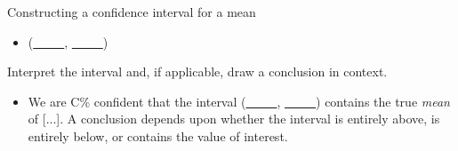 \begin{onebox}{Constructing a confidence interval for a mean}
\begin{itemize}
\begin{itemize}
\item[] $SE$ of estimate:  $\frac{s}{\sqrt{n}}$
\item[] $t^{\star}$: use technology or a $t$-table at row $df = n-1$ and confidence level C\%
\end{itemize}
\item[] (\underline{\ \ \ \ \ }, \underline{\ \ \ \ \ })
\end{itemize}
 Interpret the interval and, if applicable, draw a conclusion in context. \vspace{-1mm}
\begin{itemize}
\item[] We are C\% confident that the interval (\underline{\ \ \ \ \ }, \underline{\ \ \ \ \ }) contains the true \emph{mean} of [...].  A conclusion depends upon whether the interval is entirely above, is entirely below, or contains the value of interest. 
\end{itemize}\end{onebox}



